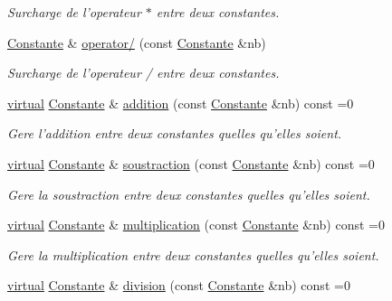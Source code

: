 \begin{DoxyCompactItemize}
\begin{DoxyCompactList}\small\item\em \-Surcharge de l'operateur $\ast$ entre deux constantes. \end{DoxyCompactList}\item 
\hyperlink{class_l_o21_1_1_constante}{\-Constante} \& \hyperlink{class_l_o21_1_1_constante_ab64f390bb6e24b854cb357fd2dc06a89}{operator/} (const \hyperlink{class_l_o21_1_1_constante}{\-Constante} \&nb)
\begin{DoxyCompactList}\small\item\em \-Surcharge de l'operateur / entre deux constantes. \end{DoxyCompactList}\item 
\hyperlink{classvirtual}{virtual} \hyperlink{class_l_o21_1_1_constante}{\-Constante} \& \hyperlink{class_l_o21_1_1_constante_afbe7b10d30d13243c9e6e53c94b9bcb4}{addition} (const \hyperlink{class_l_o21_1_1_constante}{\-Constante} \&nb) const =0
\begin{DoxyCompactList}\small\item\em \-Gere l'addition entre deux constantes quelles qu'elles soient. \end{DoxyCompactList}\item 
\hyperlink{classvirtual}{virtual} \hyperlink{class_l_o21_1_1_constante}{\-Constante} \& \hyperlink{class_l_o21_1_1_constante_aedf16155a16ea835c61e55c57643fa49}{soustraction} (const \hyperlink{class_l_o21_1_1_constante}{\-Constante} \&nb) const =0
\begin{DoxyCompactList}\small\item\em \-Gere la soustraction entre deux constantes quelles qu'elles soient. \end{DoxyCompactList}\item 
\hyperlink{classvirtual}{virtual} \hyperlink{class_l_o21_1_1_constante}{\-Constante} \& \hyperlink{class_l_o21_1_1_constante_ab2f5d581536b98c0703349fcb6536527}{multiplication} (const \hyperlink{class_l_o21_1_1_constante}{\-Constante} \&nb) const =0
\begin{DoxyCompactList}\small\item\em \-Gere la multiplication entre deux constantes quelles qu'elles soient. \end{DoxyCompactList}\item 
\hyperlink{classvirtual}{virtual} \hyperlink{class_l_o21_1_1_constante}{\-Constante} \& \hyperlink{class_l_o21_1_1_constante_a6ffc44753a672f59272792f061c8cd55}{division} (const \hyperlink{class_l_o21_1_1_constante}{\-Constante} \&nb) const =0

\end{DoxyCompactItemize}
